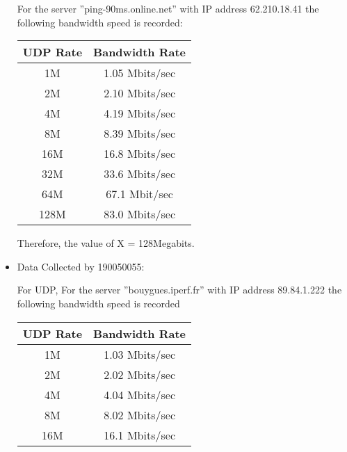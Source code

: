 \documentclass[12pt]{article}
\theoremstyle{remark}
\begin{document}
\begin{itemize}
For the server ”ping-90ms.online.net” with IP address 62.210.18.41 the following bandwidth speed is recorded:
\begin{table}[H]
    \begin{tabular}{|c| c|}
         \hline
         \textbf{UDP Rate} &  \textbf{Bandwidth Rate}\\
         \hline
         1M & 1.05 Mbits/sec
\\
         2M &   2.10 Mbits/sec
\\
         4M &   4.19 Mbits/sec
\\
         8M & 8.39 Mbits/sec

\\
        16M &  16.8 Mbits/sec
\\
        
        32M & 33.6 Mbits/sec
\\
        64M & 67.1 Mbit/sec\\
        128M &  83.0 Mbits/sec
\\
\hline
    \end{tabular}%
\end{table}
Therefore, the value of X = 128Megabits.\\

    \item Data Collected by 190050055:
\begin{table}[H]
    \centering
     \caption{TCP Bandwidth Rates}
\end{table}
For UDP,
For the server ”bouygues.iperf.fr” with IP address 89.84.1.222 the following bandwidth speed is recorded\\
\begin{table}[H]
    \begin{tabular}{|c| c|}
         \hline
         \textbf{UDP Rate} &  \textbf{Bandwidth Rate}\\
         \hline
         1M & 1.03 Mbits/sec\\
         2M &  2.02 Mbits/sec\\
         4M &  4.04 Mbits/sec\\
         8M & 8.02 Mbits/sec
\\
        16M &   16.1 Mbits/sec\\
        

\end{tabular}
\end{table}
\end{itemize}
\end{document}
